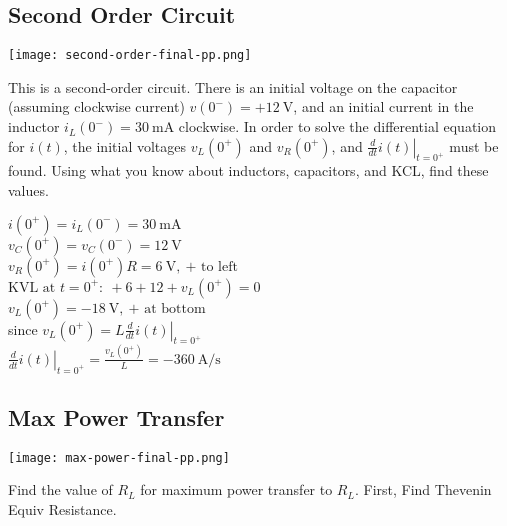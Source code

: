 \subsection*{Second Order Circuit}
\begin{center}
  \texttt{[image: second-order-final-pp.png]}
\end{center}
This is a second-order circuit. There is an initial voltage on the
capacitor (assuming clockwise current) $v(0^-)=+\qty{12}{\volt}$, and an
initial current in the inductor $i_L(0^-)=\qty{30}{\milli\ampere}$
clockwise. In order to solve the differential equation for $i(t)$, the
initial voltages $v_L(0^+)$ and $v_R(0^+)$, and
$\left.\frac{d}{dt}i(t)\right\vert_{t=0^+}$ must be found. Using what
you know about inductors, capacitors, and KCL, find these values.\\
\begin{scriptsize}
  $i\left(0^+\right)=i_L\left(0^-\right)=\qty{30}{\milli\ampere}$\\
  $v_C\left(0^+\right)=v_C\left(0^-\right)=\qty{12}{\volt}$\\
  $v_R\left(0^+\right)=i\left(0^+\right)R=\qty{6}{\volt},~\text{+ to left}$\\
  $\text{KVL at }t=0^+:~+6+12+v_L\left(0^+\right)=0$\\
  $v_L\left(0^+\right)=\qty{-18}{\volt},~\text{+ at bottom}$\\
  since $v_L\left(0^+\right)=L\left.\frac{d}{dt}i\left(t\right)\right\vert_{t=0^+}$\\
  $\left.\frac{d}{dt}i\left(t\right)\right\vert_{t=0^+}=\frac{v_L\left(0^+\right)}{L}=-\qty{360}{\ampere\per\second}$\\
\end{scriptsize}

\subsection*{Max Power Transfer}
\begin{center}
  \texttt{[image: max-power-final-pp.png]}
\end{center}
Find the value of $R_L$ for maximum power transfer to $R_L$. First, Find
Thevenin Equiv Resistance.

